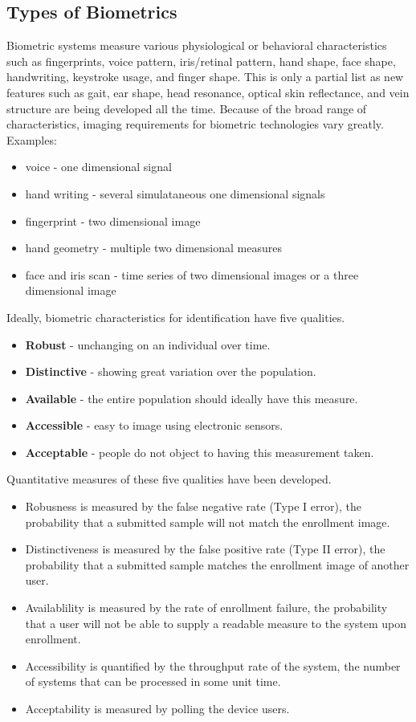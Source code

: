 \documentclass{math}
\begin{document}
\subsection*{Types of Biometrics}
Biometric systems measure various physiological or behavioral characteristics
such as fingerprints, voice pattern, iris/retinal pattern, hand shape, face
shape, handwriting, keystroke usage, and finger shape. This is only a partial
list as new features such as gait, ear shape, head resonance, optical skin
reflectance, and vein structure are being developed all the time. Because of the
broad range of characteristics, imaging requirements for biometric technologies
vary greatly. Examples:
\begin{itemize}
  \item voice - one dimensional signal
  \item hand writing - several simulataneous one dimensional signals
  \item fingerprint - two dimensional image
  \item hand geometry - multiple two dimensional measures
  \item face and iris scan - time series of two dimensional images or a three
    dimensional image
\end{itemize}
Ideally, biometric characteristics for identification have five qualities.
\begin{itemize}
  \item \textbf{Robust} - unchanging on an individual over time.
  \item \textbf{Distinctive} - showing great variation over the population.
  \item \textbf{Available} - the entire population should ideally have this
    measure.
  \item \textbf{Accessible} - easy to image using electronic sensors.
  \item \textbf{Acceptable} - people do not object to having this measurement
    taken.
\end{itemize}
Quantitative measures of these five qualities have been developed.
\begin{itemize}
  \item Robusness is measured by the false negative rate (Type I error), the
    probability that a submitted sample will not match the enrollment image.
  \item Distinctiveness is measured by the false positive rate (Type II error),
    the probability that a submitted sample matches the enrollment image of
    another user.
  \item Availablility is measured by the rate of enrollment failure, the
    probability that a user will not be able to supply a readable measure to the
    system upon enrollment.
  \item Accessibility is quantified by the throughput rate of the system, the
    number of systems that can be processed in some unit time.
  \item Acceptability is measured by polling the device users.
\end{itemize}
\end{document}
